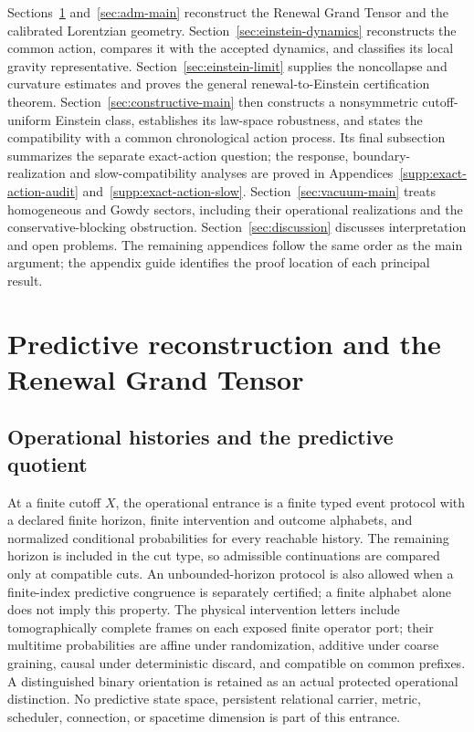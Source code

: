 \documentclass[11pt]{article}
\numberwithin{equation}{section}
\theoremstyle{definition}
\theoremstyle{remark}
\begin{document}
Sections~\ref{sec:grand-tensor-main} and~\ref{sec:adm-main} reconstruct the
Renewal Grand Tensor and the calibrated Lorentzian geometry.
Section~\ref{sec:einstein-dynamics} reconstructs the common action,
compares it with the accepted dynamics, and classifies its local
gravity representative. Section~\ref{sec:einstein-limit} supplies the
noncollapse and curvature estimates and proves the general
renewal-to-Einstein certification theorem.
Section~\ref{sec:constructive-main} then constructs a nonsymmetric
cutoff-uniform Einstein class, establishes its law-space robustness, and
states the compatibility with a common chronological action process.
Its final subsection summarizes the separate exact-action question;
the response, boundary-realization and slow-compatibility analyses are
proved in Appendices~\ref{supp:exact-action-audit} and~\ref{supp:exact-action-slow}.
Section~\ref{sec:vacuum-main} treats homogeneous and Gowdy sectors,
including their operational realizations and the conservative-blocking
obstruction. Section~\ref{sec:discussion} discusses interpretation and
open problems. The remaining appendices follow the same order as the
main argument; the appendix guide identifies the proof location of each
principal result.


\section{Predictive reconstruction and the Renewal Grand Tensor}
\label{sec:grand-tensor-main}

\subsection{Operational histories and the predictive quotient}

At a finite cutoff $X$, the operational entrance is a finite typed event
protocol with a declared finite horizon, finite intervention and outcome
alphabets, and normalized conditional probabilities for every reachable
history. The remaining horizon is included in the cut type, so admissible
continuations are compared only at compatible cuts. An unbounded-horizon
protocol is also allowed when a finite-index predictive congruence is
separately certified; a finite alphabet alone does not imply this property.  The physical intervention letters include tomographically complete
frames on each exposed finite operator port; their multitime probabilities are
affine under randomization, additive under coarse graining, causal under
deterministic discard, and compatible on common prefixes.  A distinguished
binary orientation is retained as an actual protected operational distinction.
No predictive state space, persistent relational carrier, metric, scheduler,
connection, or spacetime dimension is part of this entrance.
\end{document}
